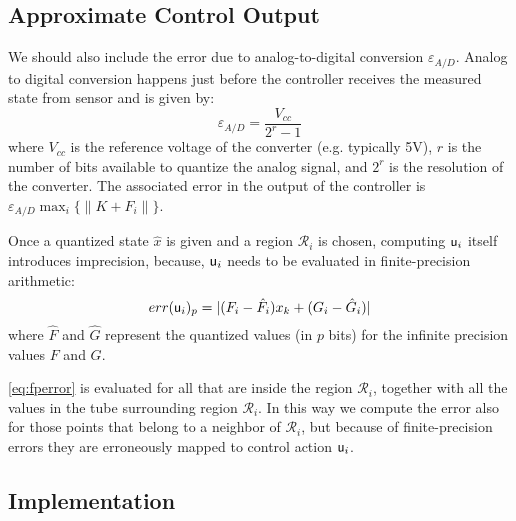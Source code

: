 \subsection{Approximate Control Output}

We should also include the error due to
analog-to-digital conversion $\varepsilon_{A/D}$.
Analog to digital conversion happens just before the controller receives the measured state from sensor
and is given by:
\begin{equation*}
\varepsilon_{A/D}=\frac{V_{cc}}{2^{r}-1}
\end{equation*}
where $V_{cc}$ is the reference voltage of the converter (e.g. typically 5V), $r$
is the number of bits available to quantize the analog signal, and $2^{r}$ is
the resolution of the converter. The associated error in the output of the controller is $\varepsilon_{A/D}\max_i\{\|K+F_i\|\}$.

Once a quantized state $\hat x$ is given and a region $\mathcal R_i$ is chosen, computing $\mathsf u_{{i}}$ itself introduces
imprecision, because, $\mathsf u_{{i}}$ needs to be evaluated in finite-precision arithmetic:
\begin{equation}\label{eq:fperror}
  err(\mathsf u_{{i}})_{p} = | (F_i - \hat{F}_{i}) x_{k} + ( G_i - \hat{G}_{i} ) |
\end{equation}
where $\hat{F}$ and $\hat{G}$ represent the quantized values (in $p$ bits) for
the infinite precision values $F$ and $G$.

\autoref{eq:fperror} is evaluated for all \statevarmath that are inside the
region $\mathcal{R}_i$, together with all the values in the tube surrounding
region $\mathcal{R}_i$.
In this way we compute the error also for those points that belong to a neighbor
of $\mathcal{R}_i$, but because of finite-precision errors they are erroneously
mapped to control action $\mathsf u_{{i}}$.

\subsection{Implementation}

